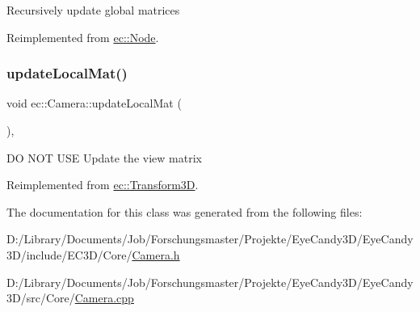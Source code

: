 Recursively update global matrices 

Reimplemented from \mbox{\hyperlink{classec_1_1_node_a12a9b14ccc434c52404e262ef5db6f80}{ec\+::\+Node}}.

\mbox{\label{classec_1_1_camera_acff95ac4ca039715d67c83111d03b8c1}} 
\subsubsection{\texorpdfstring{update\+Local\+Mat()}{updateLocalMat()}}
{\footnotesize\ttfamily void ec\+::\+Camera\+::update\+Local\+Mat (\begin{DoxyParamCaption}{ }\end{DoxyParamCaption})\hspace{0.3cm}{\ttfamily [override]}, {\ttfamily [virtual]}}

DO N\+OT U\+SE Update the view matrix 

Reimplemented from \mbox{\hyperlink{classec_1_1_transform3_d_a68d259da063ea2aff48720ae55870445}{ec\+::\+Transform3D}}.



The documentation for this class was generated from the following files\+:\begin{DoxyCompactItemize}
\item 
D\+:/\+Library/\+Documents/\+Job/\+Forschungsmaster/\+Projekte/\+Eye\+Candy3\+D/\+Eye\+Candy3\+D/include/\+E\+C3\+D/\+Core/\mbox{\hyperlink{_camera_8h}{Camera.\+h}}\item 
D\+:/\+Library/\+Documents/\+Job/\+Forschungsmaster/\+Projekte/\+Eye\+Candy3\+D/\+Eye\+Candy3\+D/src/\+Core/\mbox{\hyperlink{_camera_8cpp}{Camera.\+cpp}}\end{DoxyCompactItemize}
